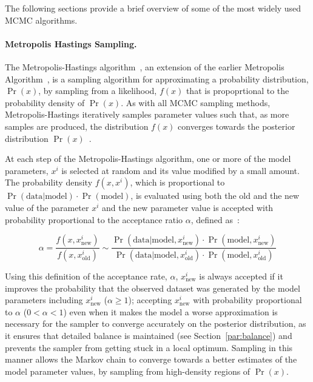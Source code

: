 The following sections provide a brief overview of some of the most widely used MCMC algorithms.  

\paragraph{Metropolis Hastings Sampling.}
The Metropolis-Hastings algorithm~\cite{hastings70}, an extension of the earlier Metropolis Algorithm~\cite{metropolis53}, is a sampling algorithm for approximating a probability distribution, $\Pr(x)$, by sampling from a likelihood, $f(x)$ that is propoprtional to the probability density of $\Pr(x)$. As with all MCMC sampling methods, Metropolis-Hastings iteratively samples parameter values such that, as more samples are produced, the distribution $f(x)$ converges towards the posterior distribution $\Pr(x)$~\cite{hastings70}. 

At each step of the Metropolis-Hastings algorithm, one or more of the model parameters, $x^i$ is selected at random and its value modified by a small amount. The probability density $f(x, x^i)$, which is proportional to $\Pr(\text{data}|\text{model}) \cdot \Pr(\text{model})$, is evaluated using both the old and the new value of the parameter $x^i$ and the new parameter value is accepted with probability proportional to the acceptance ratio $\alpha$, defined as~\cite{chib95, barberBRML2012}:

\begin{equation}
\alpha =  \frac{f(x, x^i_{\text{new}})}{f(x, x^i_{\text{old}})} \sim \frac{\Pr(\text{data}|\text{model}, x^i_{\text{new}}) \cdot \Pr(\text{model}, x^i_{\text{new}})}{\Pr(\text{data}|\text{model}, x^i_{\text{old}}) \cdot \Pr(\text{model}, x^i_{\text{old}})}
\label{eq:MH_alpha}
\end{equation}

Using this definition of the acceptance rate, $\alpha$, $x^i_{\text{new}}$ is always accepted if it improves the probability that the observed dataset was generated by the model parameters including $x^i_{\text{new}}$ ($\alpha \ge 1$); accepting $x^i_{\text{new}}$ with probability proportional to $\alpha$ ($0 < \alpha < 1$) even when it makes the model a worse approximation is necessary for the sampler to converge accurately on the posterior distribution, as it ensures that detailed balance is maintained (see Section~\ref{par:balance}) and prevents the sampler from getting stuck in a local optimum. Sampling in this manner allows the Markov chain to converge towards a better estimates of the model parameter values, by sampling from high-density regions of $\Pr(x)$.

